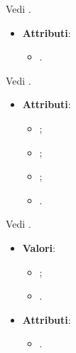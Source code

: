 \documentclass[10pt, a4paper]{article}
\begin{document}
Vedi .


\label{DocumentFilterDettaglio}
\begin{itemize}
    \item \textbf{Attributi}:
    \begin{itemize}
        \item {}.
    \end{itemize}
\end{itemize}

Vedi .


\label{DocumentMetadataDettaglio}
\begin{itemize}
    \item \textbf{Attributi}:
    \begin{itemize}
        \item {};
        \item {};
        \item {};
        \item {}.
    \end{itemize}
\end{itemize}

Vedi .

\label{DocumentTypeDettaglio}
\begin{itemize}
    \item \textbf{Valori}:
    \begin{itemize}
        \item {};
        \item {}.
    \end{itemize}
\end{itemize}

\label{ElaborationExceptionDettaglio}
\begin{itemize}
    \item \textbf{Attributi}:
    \begin{itemize}
        \item {}.
    \end{itemize}
\end{itemize}
\end{document}
